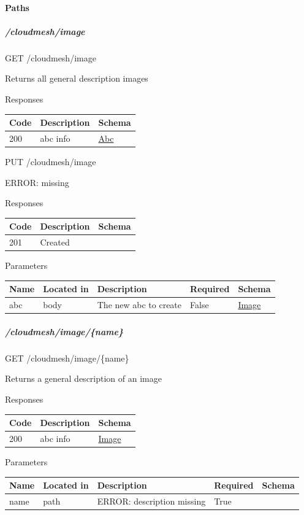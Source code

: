 \documentclass[9pt,]{article}
\let\oldparagraph\paragraph
\renewcommand{\paragraph}[1]{\oldparagraph{#1}\mbox{}}
\let\oldsubparagraph\subparagraph
\renewcommand{\subparagraph}[1]{\oldsubparagraph{#1}\mbox{}}
\begin{document}
\hypertarget{paths-13}{%
\paragraph{Paths}\label{paths-13}}

\hypertarget{cloudmeshimage}{%
\subparagraph{/cloudmesh/image}\label{cloudmeshimage}}

GET /cloudmesh/image

Returns all general description images

Responses

\begin{longtable}[]{@{}lll@{}}
\toprule
Code & Description & Schema\tabularnewline
\midrule
\endhead
200 & abc info & \protect\hyperlink{abc}{Abc}\tabularnewline
\bottomrule
\end{longtable}

PUT /cloudmesh/image

ERROR: missing

Responses

\begin{longtable}[]{@{}lll@{}}
\toprule
Code & Description & Schema\tabularnewline
\midrule
\endhead
201 & Created &\tabularnewline
\bottomrule
\end{longtable}

Parameters

\begin{longtable}[]{@{}lllll@{}}
\toprule
Name & Located in & Description & Required & Schema\tabularnewline
\midrule
\endhead
abc & body & The new abc to create & False &
\protect\hyperlink{image}{Image}\tabularnewline
\bottomrule
\end{longtable}

\hypertarget{cloudmeshimagename}{%
\subparagraph{/cloudmesh/image/\{name\}}\label{cloudmeshimagename}}

GET /cloudmesh/image/\{name\}

Returns a general description of an image

Responses

\begin{longtable}[]{@{}lll@{}}
\toprule
Code & Description & Schema\tabularnewline
\midrule
\endhead
200 & abc info & \protect\hyperlink{image}{Image}\tabularnewline
\bottomrule
\end{longtable}

Parameters

\begin{longtable}[]{@{}lllll@{}}
\toprule
Name & Located in & Description & Required & Schema\tabularnewline
\midrule
\endhead
name & path & ERROR: description missing & True &\tabularnewline
\bottomrule
\end{longtable}
\end{document}

